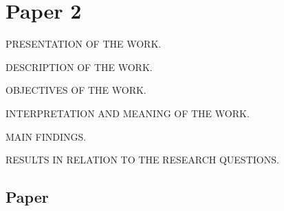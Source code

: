 \chapter{Paper 2}%
\label{ch:paper2}

PRESENTATION OF THE WORK.

DESCRIPTION OF THE WORK.

OBJECTIVES OF THE WORK.

INTERPRETATION AND MEANING OF THE WORK.

MAIN FINDINGS.

RESULTS IN RELATION TO THE RESEARCH QUESTIONS.

\section{Paper}

\lipsum[23]
